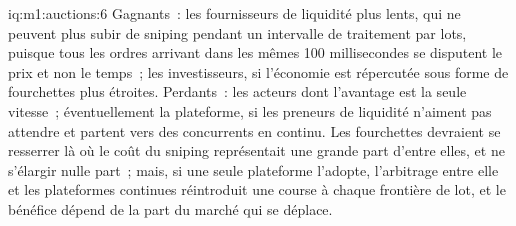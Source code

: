 \begin{solution}{iq:m1:auctions:6}
Gagnants~: les fournisseurs de liquidité plus lents, qui ne peuvent plus subir de sniping pendant un
intervalle de traitement par lots, puisque tous les ordres arrivant dans les mêmes 100 millisecondes
se disputent le prix et non le temps~; les investisseurs, si l'économie est répercutée
sous forme de fourchettes plus étroites. Perdants~: les acteurs dont l'avantage est la seule vitesse~; éventuellement la plateforme,
si les preneurs de liquidité n'aiment pas attendre et partent vers des concurrents en continu. Les fourchettes
devraient se resserrer là où le coût du sniping représentait une grande part d'entre elles, et ne s'élargir nulle part~;
mais, si une seule plateforme l'adopte, l'arbitrage entre elle et les plateformes continues
réintroduit une course à chaque frontière de lot, et le bénéfice dépend de la part
du marché qui se déplace.
\end{solution}
